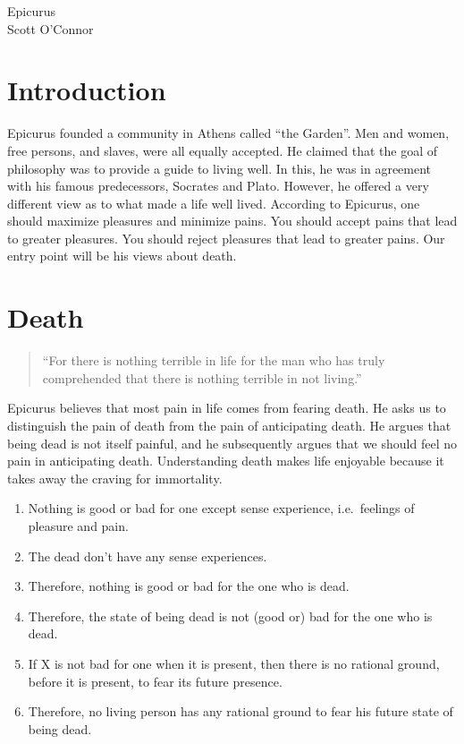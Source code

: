 \documentclass[11pt]{article}
\begin{document}
\thispagestyle{empty}
\begin{center} \LARGE{ Epicurus}\\ \vspace*{2mm}
\large{Scott O'Connor}\end{center}
\thispagestyle{empty}\vspace*{3mm}

\section*{Introduction}

Epicurus founded a community in Athens called ``the Garden''. Men and
women, free persons, and slaves, were all equally accepted. He claimed that the goal of philosophy was to provide a guide to living
well. In this, he was in agreement with his famous predecessors, Socrates and Plato. However, he offered a very different view as to what made a life well lived. According to Epicurus, one should maximize pleasures and minimize pains. You should accept pains that lead to greater pleasures. You should reject pleasures that lead to greater pains. Our entry point will be his views about death. 

\section*{Death}\label{death}

\begin{quote}
``For there is nothing terrible in life for the man who has truly
comprehended that there is nothing terrible in not living.''
 \end{quote}
Epicurus believes that most pain in life comes from fearing death. He asks us to distinguish the pain of death  from the pain of anticipating death. He argues that being dead is not itself painful, and he subsequently argues that we should feel no pain in anticipating death.  Understanding death makes life enjoyable because it takes away the craving for immortality.



\begin{enumerate}
\item Nothing is good or bad for one except sense experience, i.e.~feelings of pleasure and pain. 
\item The dead don't have any sense experiences. 
\item Therefore, nothing is good or bad for the one who is dead. 
\item Therefore, the state of being dead is not (good or) bad for the one who is dead. 
\item If X is not bad for one when it is present, then there is no rational
ground, before it is present, to fear its future presence. 
\item Therefore, no living person has any rational ground to fear his future state of being dead.
\end{enumerate}
\end{document}
